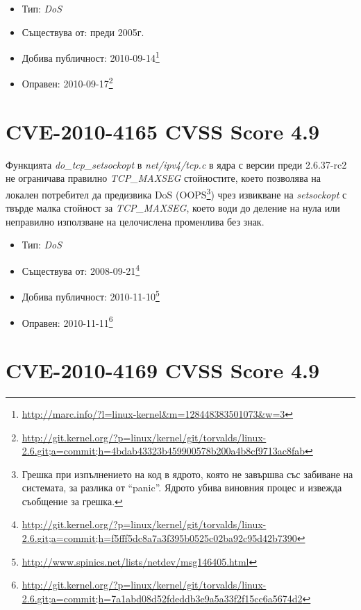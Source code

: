 \documentclass[a4paper,12pt,leqno]{article}
\begin{document}
\begin{itemize}
    \item Тип: \textit{DoS}
    \item Съществува от: преди 2005г.
    \item Добива публичност: 2010-09-14\footnote{\url{http://marc.info/?l=linux-kernel&m=128448383501073&w=3}}
    \item Оправен: 2010-09-17\footnote{\url{http://git.kernel.org/?p=linux/kernel/git/torvalds/linux-2.6.git;a=commit;h=4bdab43323b459900578b200a4b8cf9713ac8fab}}
\end{itemize}


\section{CVE-2010-4165 CVSS Score 4.9} %
\label{sec:CVE-2010-4165 CVSS Score 4.9}

Функцията \textit{do\_tcp\_setsockopt} в \textit{net/ipv4/tcp.c} в ядра с версии преди 2.6.37-rc2
не ограничава правилно \textit{TCP\_MAXSEG} стойностите, което позволява на локален потребител да
предизвика DoS (OOPS\footnote{Грешка при изпълнението на код в ядрото, която не завършва със забиване на системата, за разлика от ``panic''. Ядрото
убива виновния процес и извежда съобщение за грешка.})
чрез извикване на \textit{setsockopt} с твърде малка стойност за \textit{TCP\_MAXSEG}, което води до деление на
нула или неправилно използване на целочислена променлива без знак.
\begin{itemize}
    \item Тип: \textit{DoS}
    \item Съществува от: 2008-09-21\footnote{\url{http://git.kernel.org/?p=linux/kernel/git/torvalds/linux-2.6.git;a=commit;h=f5fff5dc8a7a3f395b0525c02ba92c95d42b7390}}
    \item Добива публичност: 2010-11-10\footnote{\url{http://www.spinics.net/lists/netdev/msg146405.html}}
    \item Оправен: 2010-11-11\footnote{\url{http://git.kernel.org/?p=linux/kernel/git/torvalds/linux-2.6.git;a=commit;h=7a1abd08d52fdeddb3e9a5a33f2f15cc6a5674d2}}
\end{itemize}



\section{ CVE-2010-4169 CVSS Score 4.9} %
\label{sec: CVE-2010-4169 CVSS Score 4.9}
\end{document}
